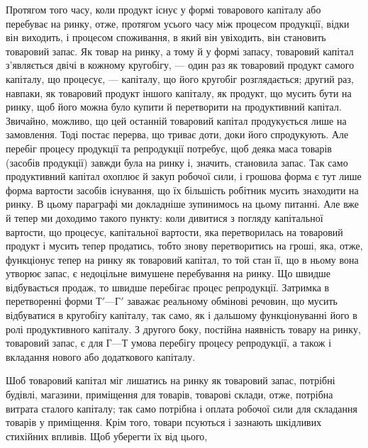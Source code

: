 Протягом того часу, коли продукт існує у формі товарового капіталу
або перебуває на ринку, отже, протягом усього часу між процесом
продукції, відки він виходить, і процесом споживання, в який він увіходить,
він становить товаровий запас. Як товар на ринку, а тому й у формі
запасу, товаровий капітал з’являється двічі в кожному кругобігу, — один
раз як товаровий продукт самого капіталу, що процесує, — капіталу, що
його кругобіг розглядається; другий раз, навпаки, як товаровий продукт
іншого капіталу, як продукт, що мусить бути на ринку, щоб його
можна було купити й перетворити на продуктивний капітал. Звичайно,
можливо, що цей останній товаровий капітал продукується лише на
замовлення. Тоді постає перерва, що триває доти, доки його спродукують.
Але перебіг процесу продукції та репродукції потребує, щоб деяка маса
товарів (засобів продукції) завжди була на ринку і, значить, становила запас.
Так само продуктивний капітал охоплює й закуп робочої сили, і грошова
форма є тут лише форма вартости засобів існування, що їх більшість робітник
мусить знаходити на ринку. В цьому параграфі ми докладніше зупинимось
на цьому питанні. Але вже й тепер ми доходимо такого пункту:
коли дивитися з погляду капітальної вартости, що процесує, капітальної
вартости, яка перетворилась на товаровий продукт і мусить тепер продатись,
тобто знову перетворитись на гроші, яка, отже, функціонує тепер на ринку
як товаровий капітал, то той стан її, що в ньому вона утворює запас, є
недоцільне вимушене перебування на ринку. Що швидше відбувається
продаж, то швидше перебігає процес репродукції. Затримка в
перетворенні форми $Т' — Г'$ заважає реальному обмінові речовин, що
мусить відбуватися в кругобігу капіталу, так само, як і дальшому функціонуванні
його в ролі продуктивного капіталу. З другого боку, постійна
наявність товару на ринку, товаровий запас, є для $Г — Т$ умова перебігу
процесу репродукції, а також і вкладання нового або додаткового
капіталу.

Шоб товаровий капітал міг лишатись на ринку як товаровий запас,
потрібні будівлі, магазини, приміщення для товарів, товарові склади, отже,
потрібна витрата сталого капіталу; так само потрібна і оплата робочої
сили для складання товарів у приміщення. Крім того, товари псуються
і зазнають шкідливих стихійних впливів. Щоб уберегти їх від цього,
\parbreak{}  %
